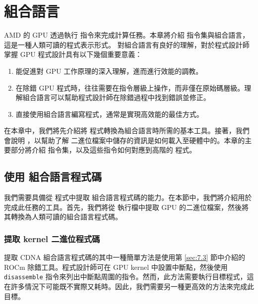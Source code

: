 \chapter{ 組合語言}\label{AppendiceB}

AMD 的  GPU 透過執行  指令來完成計算任務。本章將介紹  指令集與組合語言，這是一種人類可讀的程式表示形式。
對組合語言有良好的理解，對於程式設計師掌握 GPU 程式設計具有以下幾個重要意義：

\begin{enumerate}
\item 能促進對 GPU 工作原理的深入理解，進而進行效能的調教。
\item 在除錯 GPU 程式時，往往需要在指令層級上操作，而非僅在原始碼層級。理解組合語言可以幫助程式設計師在除錯過程中找到錯誤並修正。
\item 直接使用組合語言編寫程式，通常是實現高效能的最佳方式。
\end{enumerate}

在本章中，我們將先介紹將  程式轉換為組合語言時所需的基本工具。接著，我們會說明 ，以幫助了解  二進位檔案中儲存的資訊是如何載入至硬體中的。本章的主要部分將介紹  指令集，以及這些指令如何對應到高階的  程式。



\section{使用  組合語言程式碼}

我們需要具備從  程式中提取  組合語言程式碼的能力。在本節中，我們將介紹用於完成此任務的工具。首先，我們將從  執行檔中提取 GPU 的二進位檔案，然後將其轉換為人類可讀的組合語言程式碼。

\subsection{提取  kernel 二進位程式碼}

提取 CDNA 組合語言程式碼的其中一種簡單方法是使用第 \ref{sec:7.3} 節中介紹的 ROCm 除錯工具。程式設計師可在 GPU kernel 中設置中斷點，然後使用 \lstinline|disassemble| 指令來列出中斷點周圍的指令。然而，此方法需要執行目標程式，這在許多情況下可能既不實際又耗時。因此，我們需要另一種更高效的方法來完成此目標。

